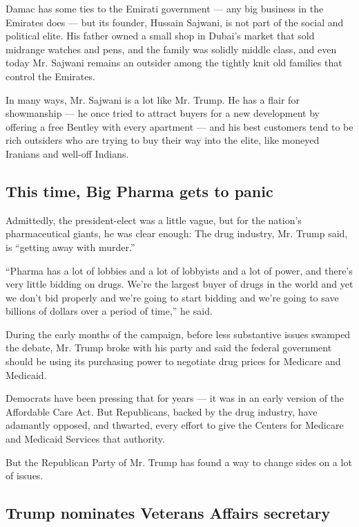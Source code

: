 Damac has some ties to the Emirati government --- any big business in
the Emirates does --- but its founder, Hussain Sajwani, is not part of
the social and political elite. His father owned a small shop in Dubai's
market that sold midrange watches and pens, and the family was solidly
middle class, and even today Mr. Sajwani remains an outsider among the
tightly knit old families that control the Emirates.

In many ways, Mr. Sajwani is a lot like Mr. Trump. He has a flair for
showmanship --- he once tried to attract buyers for a new development by
offering a free Bentley with every apartment --- and his best customers
tend to be rich outsiders who are trying to buy their way into the
elite, like moneyed Iranians and well-off Indians.

\hypertarget{this-time-big-pharma-gets-to-panic}{%
\subsection{This time, Big Pharma gets to
panic}\label{this-time-big-pharma-gets-to-panic}}

Admittedly, the president-elect was a little vague, but for the nation's
pharmaceutical giants, he was clear enough: The drug industry, Mr. Trump
said, is ``getting away with murder.''

``Pharma has a lot of lobbies and a lot of lobbyists and a lot of power,
and there's very little bidding on drugs. We're the largest buyer of
drugs in the world and yet we don't bid properly and we're going to
start bidding and we're going to save billions of dollars over a period
of time,'' he said.

During the early months of the campaign, before less substantive issues
swamped the debate, Mr. Trump broke with his party and said the federal
government should be using its purchasing power to negotiate drug prices
for Medicare and Medicaid.

Democrats have been pressing that for years --- it was in an early
version of the Affordable Care Act. But Republicans, backed by the drug
industry, have adamantly opposed, and thwarted, every effort to give the
Centers for Medicare and Medicaid Services that authority.

But the Republican Party of Mr. Trump has found a way to change sides on
a lot of issues.

\hypertarget{trump-nominates-veterans-affairs-secretary}{%
\subsection{Trump nominates Veterans Affairs
secretary}\label{trump-nominates-veterans-affairs-secretary}}

